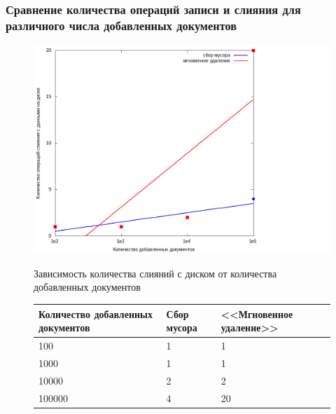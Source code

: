 \documentclass[aspectratio=169, pdf, 8pt, unicode]{beamer}
\begin{document}
\begin{frame}[fragile]
\frametitle{Сравнение количества операций записи и слияния для различного числа добавленных документов}
\begin{figure}[H]
\centering
\begin{minipage}[h]{0.55\linewidth}
\includegraphics[width=1\textwidth]{fig/merges.png}
\caption{Зависимость количества слияний с диском от количества добавленных документов}
\end{minipage}
\hfil
\begin{minipage}[h]{0.35\linewidth}
\caption{Время работы алгоритмов, с}
\begin{table}[H]
      \centering
      \small
      \singlespacing
      \begin{tabular}{|p{1.5cm}|p{1.5cm}|p{1.5cm}|}
        \hline
        Количество добавленных документов   & Сбор мусора                 & <<Мгновенное удаление>>     \\ \hline \hline
            100                                 & 1                           & 1                           \\ \hline
            1000                                & 1                           & 1                           \\ \hline
            10000                               & 2                           & 2                           \\ \hline
            100000                              & 4                           & 20                          \\ \hline
\end{tabular}
\end{table}
\end{minipage}
\end{figure}
\end{frame}
\end{document}
